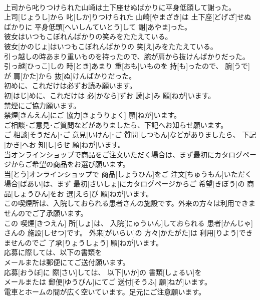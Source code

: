 \documentclass[8pt]{extreport}
\begin{document}
\begin{CJK}{UTF8}{min}
\\	上司から叱りつけられた山崎は土下座せぬばかりに平身低頭して謝った。	
\\	上司[じょうし]から 叱[しか]りつけられた 山崎[やまざき]は 土下座[どげざ]せぬばかりに 平身低頭[へいしんていとう]して 謝[あやま]った。
\\	彼女はいつもこぼれんばかりの笑みをたたえている。	
\\	彼女[かのじょ]はいつもこぼれんばかりの 笑[え]みをたたえている。
\\	引っ越しの時あまり重いものを持ったので、腕が肩から抜けんばかりだった。	
\\	引っ越[ひっこ]しの 時[とき]あまり 重[おも]いものを 持[も]ったので、 腕[うで]が 肩[かた]から 抜[ぬ]けんばかりだった。
\\	初めに、これだけは必ずお読み願います。	
\\	初[はじ]めに、これだけは 必[かなら]ずお 読[よ]み 願[ねが]います。
\\	禁煙にご協力願います。	
\\	禁煙[きんえん]にご 協力[きょうりょく] 願[ねが]います。
\\	ご相談･ご意見･ご質問などがありましたら、下記へお知らせ願います。	
\\	ご 相談[そうだん]･ご 意見[いけん]･ご 質問[しつもん]などがありましたら、 下記[かき]へお 知[し]らせ 願[ねが]います。
\\	当オンラインショップで商品をご注文いただく場合は、まず最初にカタログページからご希望の商品をお選び願います。	
\\	当[とう]オンラインショップで 商品[しょうひん]をご 注文[ちゅうもん]いただく 場合[ばあい]は、まず 最初[さいしょ]にカタログページからご 希望[きぼう]の 商品[しょうひん]をお 選[えら]び 願[ねが]います。
\\	この喫煙所は、入院しておられる患者さんの施設です。外来の方々は利用できませんのでご了承願います。	
\\	この 喫煙[きつえん] 所[しょ]は、 入院[にゅういん]しておられる 患者[かんじゃ]さんの 施設[しせつ]です。 外来[がいらい]の 方々[かたがた]は 利用[りよう]できませんのでご 了承[りょうしょう] 願[ねが]います。
\\	応募に際しては、以下の書類を
\\	メールまたは郵便にてご送付願います。	
\\	応募[おうぼ]に 際[さい]しては、 以下[いか]の 書類[しょるい]を 
\\	メールまたは 郵便[ゆうびん]にてご 送付[そうふ] 願[ねが]います。
\\	電車とホームの間が広く空いています。足元にご注意願います。	

\end{CJK}
\end{document}
